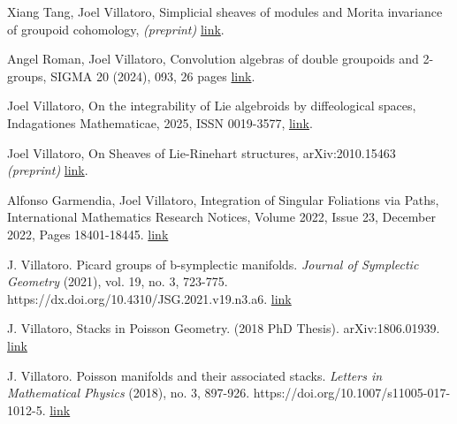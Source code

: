 \documentclass[margin,line,pifont,palatino,courier]{res}
\begin{document}
\begin{resume}
Xiang Tang, Joel Villatoro, Simplicial sheaves of modules and Morita invariance of groupoid cohomology, \textit{(preprint)} \href{https://arxiv.org/abs/2509.07285}{link}.

Angel Roman, Joel Villatoro, Convolution algebras of double groupoids and 2-groups, SIGMA 20 (2024), 093, 26 pages \href{https://arxiv.org/pdf/2312.00341}{link}.

Joel Villatoro, On the integrability of Lie algebroids by diffeological spaces, Indagationes Mathematicae, 2025, ISSN 0019-3577, \href{https://doi.org/10.1016/j.indag.2025.07.011}{link}.

Joel Villatoro, On Sheaves of Lie-Rinehart structures, arXiv:2010.15463 \textit{(preprint)} \href{https://arxiv.org/pdf/2010.15463.pdf}{link}.

Alfonso Garmendia, Joel Villatoro, 
Integration of Singular Foliations via Paths, 
International Mathematics Research Notices, 
Volume 2022, Issue 23, December 2022, 
Pages 18401-18445. \href{https://academic.oup.com/imrn/article-abstract/2022/23/18401/6362694}{link}

J. Villatoro. Picard groups of b-symplectic manifolds. \textit{Journal of Symplectic Geometry} (2021), vol. 19, no. 3, 723-775. https://dx.doi.org/10.4310/JSG.2021.v19.n3.a6. \href{https://www.intlpress.com/site/pub/files/_fulltext/journals/jsg/2021/0019/0003/JSG-2021-0019-0003-a006.pdf}{link}

J. Villatoro, Stacks in Poisson Geometry.
(2018 PhD Thesis). arXiv:1806.01939. \href{https://arxiv.org/abs/1806.01939}{link}

J. Villatoro. Poisson manifolds and their associated stacks. \textit{Letters in Mathematical Physics}
(2018), no. 3, 897-926. https://doi.org/10.1007/s11005-017-1012-5. \href{https://link.springer.com/article/10.1007/s11005-017-1012-5}{link}



\end{resume}
\end{document}
